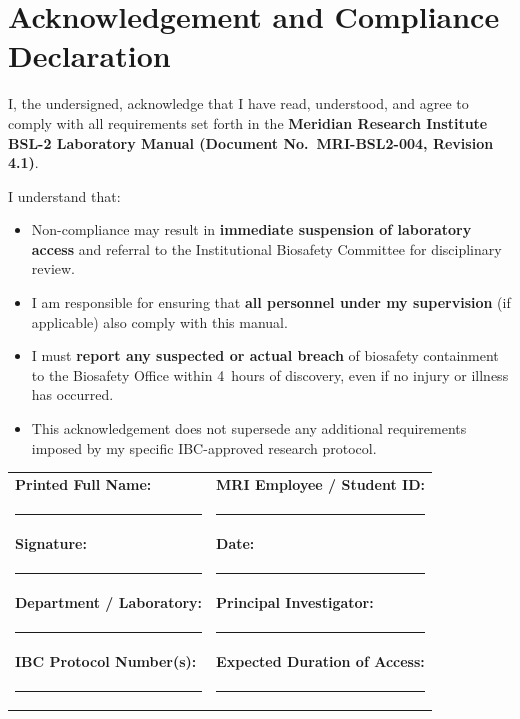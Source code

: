 
\section{Acknowledgement and Compliance Declaration}
\label{sec:acknowledgement}

\vspace{6pt}
\begin{tcolorbox}[
  enhanced,
  colback=BSLlight,
  colframe=BSLamber,
  boxrule=1.2pt,
  arc=4pt,
  outer arc=4pt,
  left=12pt, right=12pt, top=10pt, bottom=10pt
]
{\sffamily\small
I, the undersigned, acknowledge that I have read, understood, and agree to comply
with all requirements set forth in the \textbf{Meridian Research Institute BSL-2
Laboratory Manual (Document No.\ MRI-BSL2-004, Revision 4.1)}.

\medskip
I understand that:
\begin{itemize}[leftmargin=1.6em, itemsep=2pt]
  \item Non-compliance may result in \textbf{immediate suspension of laboratory
        access} and referral to the Institutional Biosafety Committee for disciplinary
        review.
  \item I am responsible for ensuring that \textbf{all personnel under my
        supervision} (if applicable) also comply with this manual.
  \item I must \textbf{report any suspected or actual breach} of biosafety
        containment to the Biosafety Office within 4~hours of discovery, even if no
        injury or illness has occurred.
  \item This acknowledgement does not supersede any additional requirements imposed
        by my specific IBC-approved research protocol.
\end{itemize}
}
\end{tcolorbox}

\vspace{16pt}

\begin{tabularx}{\linewidth}{@{} X X @{}}
\textbf{Printed Full Name:} & \textbf{MRI Employee / Student ID:} \\[14pt]
\rule{\linewidth}{0.4pt} & \rule{\linewidth}{0.4pt} \\[16pt]
\textbf{Signature:} & \textbf{Date:} \\[14pt]
\rule{\linewidth}{0.4pt} & \rule{\linewidth}{0.4pt} \\[16pt]
\textbf{Department / Laboratory:} & \textbf{Principal Investigator:} \\[14pt]
\rule{\linewidth}{0.4pt} & \rule{\linewidth}{0.4pt} \\[16pt]
\textbf{IBC Protocol Number(s):} & \textbf{Expected Duration of Access:} \\[14pt]
\rule{\linewidth}{0.4pt} & \rule{\linewidth}{0.4pt} \\
\end{tabularx}

